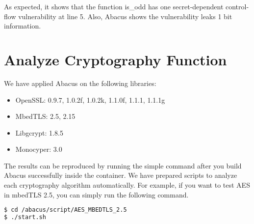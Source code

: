 \documentclass[10pt,conference]{IEEEtran}
\newcommand{\tool}{\textsf{Abacus}}
\begin{document}
As expected, it shows that the function \textsf{is\_odd} has one secret-dependent control-flow vulnerability at line 5. Also, Abacus shows the vulnerability leaks 1 bit information.

\section{Analyze Cryptography Function}
We have applied \tool{} on the following libraries:
\begin{itemize}
\item OpenSSL: 0.9.7, 1.0.2f, 1.0.2k, 1.1.0f, 1.1.1, 1.1.1g
\item MbedTLS: 2.5, 2.15
\item Libgcrypt: 1.8.5
\item Monocyper: 3.0
\end{itemize}

The results can be reproduced by running the simple command after you build \tool{} successfully inside the container. We have prepared scripts to analyze each cryptography algorithm automatically.
For example, if you want to test AES in mbedTLS 2.5, you can simply run the 
following command.

\begin{lstlisting}[language=bash]
$ cd /abacus/script/AES_MBEDTLS_2.5
$ ./start.sh
\end{lstlisting}
\end{document}
